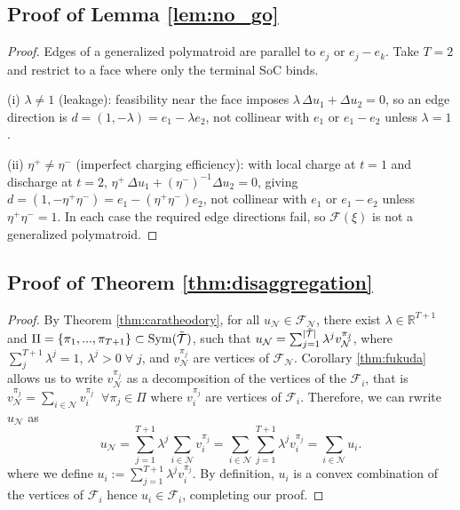 \subsection{Proof of Lemma \ref{lem:no_go}}
\begin{proof}
    Edges of a generalized polymatroid are parallel to $e_j$ or $e_j-e_k$.
    Take $T=2$ and restrict to a face where only the terminal SoC binds.
    
    (i) $\lambda\ne1$ (leakage): feasibility near the face imposes $\lambda\,\Delta u_1+\Delta u_2=0$, so an edge direction is
    $d=(1,-\lambda)=e_1-\lambda e_2$, not collinear with $e_1$ or $e_1-e_2$ unless $\lambda=1$.
    
    (ii) $\eta^+\ne\eta^-$ (imperfect charging efficiency): with local charge at $t=1$ and discharge at $t=2$,
    $\eta^+\,\Delta u_1+(\eta^-)^{-1}\Delta u_2=0$, giving
    $d=(1,-\eta^+\eta^-)=e_1-(\eta^+\eta^-)e_2$, not collinear with $e_1$ or $e_1-e_2$ unless $\eta^+\eta^-=1$.
    In each case the required edge directions fail, so $\mathcal{F}(\xi)$ is not a generalized polymatroid.
    \end{proof}

\subsection{Proof of Theorem \ref{thm:disaggregation}}
\begin{proof}
    By Theorem \ref{thm:caratheodory}, for all $u_\mathcal{N} \in \mathcal{F}_\mathcal{N}$, there exist $\lambda \in \mathbb{R}^{T + 1}$ and $\Pi = \{\pi_1, ..., \pi_{T+1}\} \subset \mathrm{Sym}(\Tilde{\mathcal{T}})$, such that $
        u_\mathcal{N} = \sum_{j=1}^{|\Tilde{\mathcal{T}}|} \lambda^j v_\mathcal{N}^{\pi_j}$,
    where $\sum_j^{T+1}\lambda^j = 1$, $\lambda^j > 0 \; \forall \;j$, and  $v_\mathcal{N}^{\pi_j}$ are vertices of $\mathcal{F}_\mathcal{N}$.
    Corollary \ref{thm:fukuda} allows us to write $ v_\mathcal{N}^{\pi_j}$ as a decomposition of the vertices of the $\mathcal{F}_i$, that is $v_\mathcal{N}^{\pi_j} = \sum_{i\in \mathcal{N}} v_i^{\pi_j} \;\;\forall \pi_j \in \Pi$  where $v_i^{\pi_j}$ are vertices of $\mathcal{F}_i$. Therefore, we can rwrite $u_\mathcal{N}$ as
    \begin{equation*}
        u_\mathcal{N} = \sum_{j=1}^{T+1} \lambda^j \sum_{i\in \mathcal{N}} v_i^{\pi_j} = \sum_{i\in \mathcal{N}} \sum_{j=1}^{T+1} \lambda^j v_i^{\pi_j} = \sum_{i\in \mathcal{N}} u_i.
    \end{equation*}
     where we define $u_i := \sum_{j=1}^{T+1} \lambda^j v_i^{\pi_j}$. By definition, $u_i$ is a convex combination of the vertices of $\mathcal{F}_i$ hence $u_i \in \mathcal{F}_i$, completing our proof.
\end{proof}




